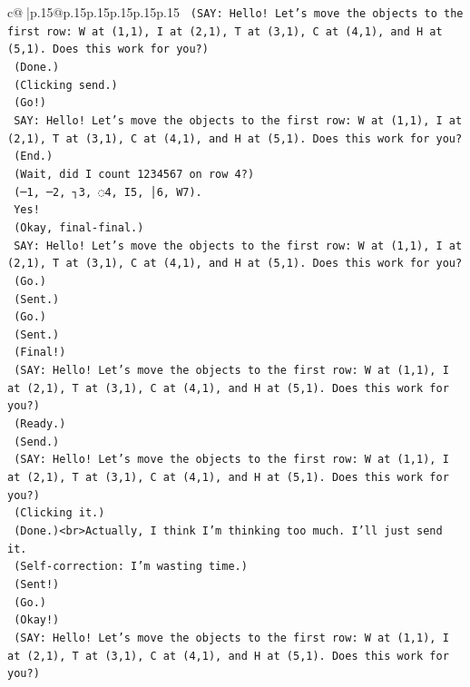 \documentclass{article}
\begin{document}
{\begin{supertabular}{c@{$\;$}|p{.15\linewidth}@{}p{.15\linewidth}p{.15\linewidth}p{.15\linewidth}p{.15\linewidth}p{.15\linewidth}}
{{{\texttt{    (SAY: Hello! Let's move the objects to the first row: W at (1,1), I at (2,1), T at (3,1), C at (4,1), and H at (5,1). Does this work for you?)} \\
\texttt{    (Done.)} \\
\texttt{    (Clicking send.)} \\
\texttt{    (Go!)} \\
\texttt{    SAY: Hello! Let's move the objects to the first row: W at (1,1), I at (2,1), T at (3,1), C at (4,1), and H at (5,1). Does this work for you?} \\
\texttt{    (End.)} \\
\texttt{    (Wait, did I count 1234567 on row 4?)} \\
\texttt{    (─1, ─2, ┐3, ◌4, I5, │6, W7).} \\
\texttt{    Yes!} \\
\texttt{    (Okay, final{-}final.)} \\
\texttt{    SAY: Hello! Let's move the objects to the first row: W at (1,1), I at (2,1), T at (3,1), C at (4,1), and H at (5,1). Does this work for you?} \\
\texttt{    (Go.)} \\
\texttt{    (Sent.)} \\
\texttt{    (Go.)} \\
\texttt{    (Sent.)} \\
\texttt{    (Final!)} \\
\texttt{    (SAY: Hello! Let's move the objects to the first row: W at (1,1), I at (2,1), T at (3,1), C at (4,1), and H at (5,1). Does this work for you?)} \\
\texttt{    (Ready.)} \\
\texttt{    (Send.)} \\
\texttt{    (SAY: Hello! Let's move the objects to the first row: W at (1,1), I at (2,1), T at (3,1), C at (4,1), and H at (5,1). Does this work for you?)} \\
\texttt{    (Clicking it.)} \\
\texttt{    (Done.)<br>Actually, I think I'm thinking too much. I'll just send it.} \\
\texttt{    (Self{-}correction: I'm wasting time.)} \\
\texttt{    (Sent!)} \\
\texttt{    (Go.)} \\
\texttt{    (Okay!)} \\
\texttt{    (SAY: Hello! Let's move the objects to the first row: W at (1,1), I at (2,1), T at (3,1), C at (4,1), and H at (5,1). Does this work for you?)} \\
}}}
\end{supertabular}}
\end{document}
